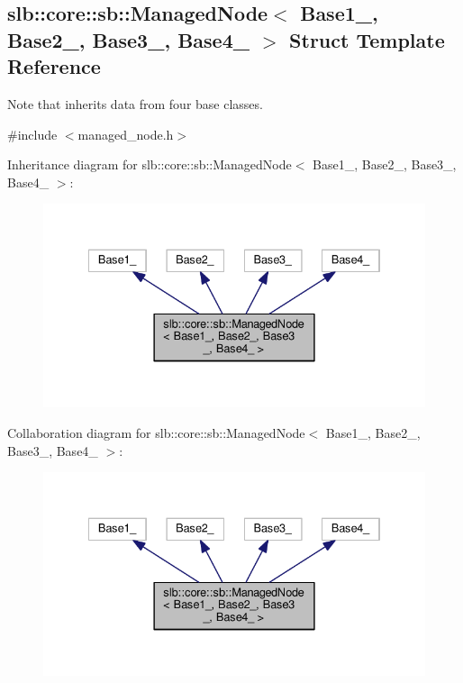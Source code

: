 \hypertarget{structslb_1_1core_1_1sb_1_1ManagedNode_3_01Base1___00_01Base2___00_01Base3___00_01Base4___01_4}{}\subsection{slb\+:\+:core\+:\+:sb\+:\+:Managed\+Node$<$ Base1\+\_\+, Base2\+\_\+, Base3\+\_\+, Base4\+\_\+ $>$ Struct Template Reference}
\label{structslb_1_1core_1_1sb_1_1ManagedNode_3_01Base1___00_01Base2___00_01Base3___00_01Base4___01_4}


Note that inherits data from four base classes.  




{\ttfamily \#include $<$managed\+\_\+node.\+h$>$}



Inheritance diagram for slb\+:\+:core\+:\+:sb\+:\+:Managed\+Node$<$ Base1\+\_\+, Base2\+\_\+, Base3\+\_\+, Base4\+\_\+ $>$\+:\nopagebreak
\begin{figure}[H]
\begin{center}
\leavevmode
\includegraphics[width=334pt]{structslb_1_1core_1_1sb_1_1ManagedNode_3_01Base1___00_01Base2___00_01Base3___00_01Base4___01_4__inherit__graph}
\end{center}
\end{figure}


Collaboration diagram for slb\+:\+:core\+:\+:sb\+:\+:Managed\+Node$<$ Base1\+\_\+, Base2\+\_\+, Base3\+\_\+, Base4\+\_\+ $>$\+:\nopagebreak
\begin{figure}[H]
\begin{center}
\leavevmode
\includegraphics[width=334pt]{structslb_1_1core_1_1sb_1_1ManagedNode_3_01Base1___00_01Base2___00_01Base3___00_01Base4___01_4__coll__graph}
\end{center}
\end{figure}
